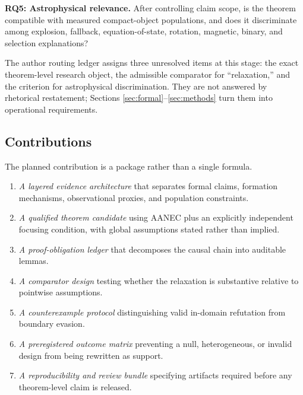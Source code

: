 \documentclass[conference]{IEEEtran}
\begin{document}
\textbf{RQ5: Astrophysical relevance.} After controlling claim scope, is the theorem compatible with measured compact-object populations, and does it discriminate among explosion, fallback, equation-of-state, rotation, magnetic, binary, and selection explanations?

The author routing ledger assigns three unresolved items at this stage: the exact theorem-level research object, the admissible comparator for ``relaxation,'' and the criterion for astrophysical discrimination. They are not answered by rhetorical restatement; Sections \ref{sec:formal}--\ref{sec:methods} turn them into operational requirements.

\subsection{Contributions}
The planned contribution is a package rather than a single formula.
\begin{enumerate}
\item \emph{A layered evidence architecture} that separates formal claims, formation mechanisms, observational proxies, and population constraints.
\item \emph{A qualified theorem candidate} using AANEC plus an explicitly independent focusing condition, with global assumptions stated rather than implied.
\item \emph{A proof-obligation ledger} that decomposes the causal chain into auditable lemmas.
\item \emph{A comparator design} testing whether the relaxation is substantive relative to pointwise assumptions.
\item \emph{A counterexample protocol} distinguishing valid in-domain refutation from boundary evasion.
\item \emph{A preregistered outcome matrix} preventing a null, heterogeneous, or invalid design from being rewritten as support.
\item \emph{A reproducibility and review bundle} specifying artifacts required before any theorem-level claim is released.
\end{enumerate}
\end{document}
